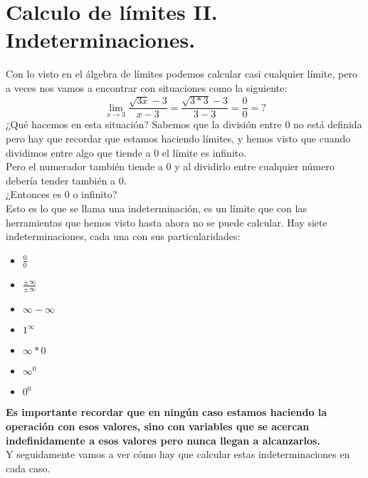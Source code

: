 \documentclass[a4paper,11pt,answers]{exam}
\begin{document}
\section{Calculo de límites II. Indeterminaciones.}
Con lo visto en el álgebra de límites podemos calcular casi cualquier límite, pero a veces nos vamos a encontrar con situaciones como la siguiente:
\[\lim_{x \to 3} \frac{\sqrt{3x} - 3 }{x-3} = \frac{\sqrt{3*3} - 3}{3 - 3} = \frac{0}{0} = ?\]
¿Qué hacemos en esta situación? Sabemos que la división entre 0 no está definida pero hay que recordar que estamos haciendo límites, y hemos visto que cuando dividimos entre algo que tiende a 0 el límite es infinito.\\
Pero el numerador también tiende a 0 y al dividirlo entre cualquier número debería tender también a 0.\\
¿Entonces es 0 o infinito?\\

Esto es lo que se llama una indeterminación, es un límite que con las herramientas que hemos visto hasta ahora no se puede calcular. Hay siete indeterminaciones, cada una con sus particularidades:
\begin{itemize}
	\item $\frac{0}{0}$
	\item $\frac{\pm\infty}{\pm\infty}$
	\item $\infty - \infty$
	\item $1^\infty$
	\item $\infty * 0$
	\item $\infty^0$
	\item $0^0$
\end{itemize}
\textbf{Es importante recordar que en ningún caso estamos haciendo la operación con esos valores, sino con variables que se acercan indefinidamente a esos valores pero nunca llegan a alcanzarlos.}\\

Y seguidamente vamos a ver cómo hay que calcular estas indeterminaciones en cada caso.
\end{document}
